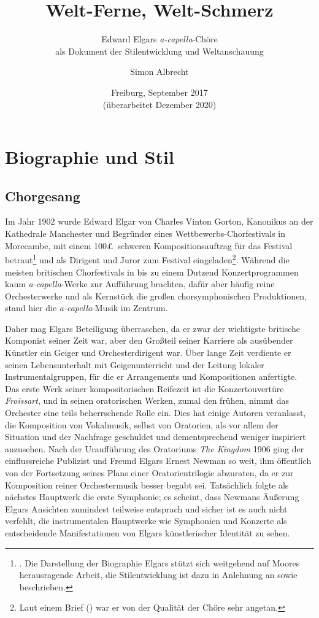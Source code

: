 \documentclass[a4paper,11pt,open=any]{scrbook}
\author{Simon Albrecht}
\title{Welt-Ferne, Welt-Schmerz}
\subtitle{
Edward Elgars \textit{a-capella}-Chöre \\
als Dokument der Stilentwicklung und Weltanschauung
}
\date{Freiburg, September 2017 \\ (überarbeitet Dezember 2020)}
\begin{document}
\maketitle

\tableofcontents

\chapter{Biographie und Stil}

\section{Chorgesang}
Im Jahr 1902 wurde Edward Elgar von Charles Vinton Gorton, Kanonikus an der
Kathedrale Manchester und Begründer eines Wettbewerbs-Chorfestivals in Morecambe,
mit einem 100\pounds\ schweren Kompositionsauftrag für das Festival
betraut\footnote{\cite[S.~376]{moore}.  Die Darstellung der Biographie
Elgars stützt sich weitgehend auf Moores herausragende Arbeit, die
Stilentwicklung ist dazu in Anlehnung an \cite[S.~12–24]{harperscott2006}
sowie \cite{butt-rcath} beschrieben.} und als Dirigent und Juror zum Festival
eingeladen\footnote{\cite[S.~viii.]{ece13}  Laut einem Brief (\cite[S.~128f.]{elgar-letters})
war er von der Qualität der Chöre sehr angetan.}.  Während die meisten
britischen Chorfestivals in bis zu einem Dutzend Konzertprogrammen kaum \textit{a-capella}-Werke
zur Aufführung brachten, dafür aber häufig reine Orchesterwerke und als
Kernstück die großen chorsymphonischen Produktionen, stand hier die \textit{a-capella}-Musik
im Zentrum.

Daher mag Elgars Beteiligung überraschen, da er zwar der wichtigste britische
Komponist seiner Zeit war, aber den Großteil seiner Karriere als ausübender
Künstler ein Geiger und Orchesterdirigent war.  Über lange Zeit verdiente
er seinen Lebensunterhalt mit Geigenunterricht und der Leitung lokaler
Instrumentalgruppen, für die er Arrangements und Kompositionen anfertigte.
Das erste Werk seiner kompositorischen Reifezeit ist die Konzertouvertüre
\textit{Froissart}, und in seinen oratorischen Werken, zumal den frühen,
nimmt das Orchester eine teils beherrschende Rolle ein.  Dies hat einige
Autoren veranlasst, die Komposition von Vokalmusik, selbst von Oratorien,
als vor allem der Situation und der Nachfrage geschuldet und dementsprechend
weniger inspiriert anzusehen.  Nach der Uraufführung des Oratoriums \textit{The
Kingdom} 1906 ging der einflussreiche Publizist und Freund Elgars Ernest
Newman so weit, ihm öffentlich von der Fortsetzung seines Plans einer
Oratorientrilogie abzuraten\cite[S.~507]{moore}, da er zur Komposition
reiner Orchestermusik besser begabt sei.  Tatsächlich folgte als nächstes
Hauptwerk die erste Symphonie; es scheint, dass Newmans Äußerung Elgars
Ansichten zumindest teilweise entsprach und sicher ist es auch nicht
verfehlt, die instrumentalen Hauptwerke wie Symphonien und Konzerte als
entscheidende Manifestationen von Elgars künstlerischer Identität zu sehen.
\end{document}
